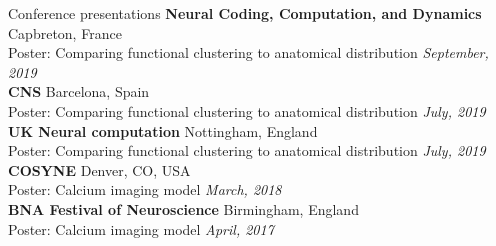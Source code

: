\documentclass{resume} %
\begin{document}

\begin{rSection}{Conference presentations}
  \textbf{Neural Coding, Computation, and Dynamics} \hfill Capbreton, France \\ \vspace{1.5mm}
  Poster: Comparing functional clustering to anatomical distribution \hfill \textit{September, 2019} \\
  \textbf{CNS} \hfill Barcelona, Spain \\ \vspace{1.5mm}
  Poster: Comparing functional clustering to anatomical distribution \hfill \textit{July, 2019}\\
  \textbf{UK Neural computation} \hfill Nottingham, England \\ \vspace{1.5mm}
  Poster: Comparing functional clustering to anatomical distribution \hfill \textit{July, 2019}\\
  \textbf{COSYNE} \hfill Denver, CO, USA \\ \vspace{1.5mm}
  Poster: Calcium imaging model \hfill \textit{March, 2018}\\
  \textbf{BNA Festival of Neuroscience} \hfill Birmingham, England \\ \vspace{1.5mm}
  Poster: Calcium imaging model \hfill \textit{April, 2017}
\end{rSection}

\newpage

\end{document}
